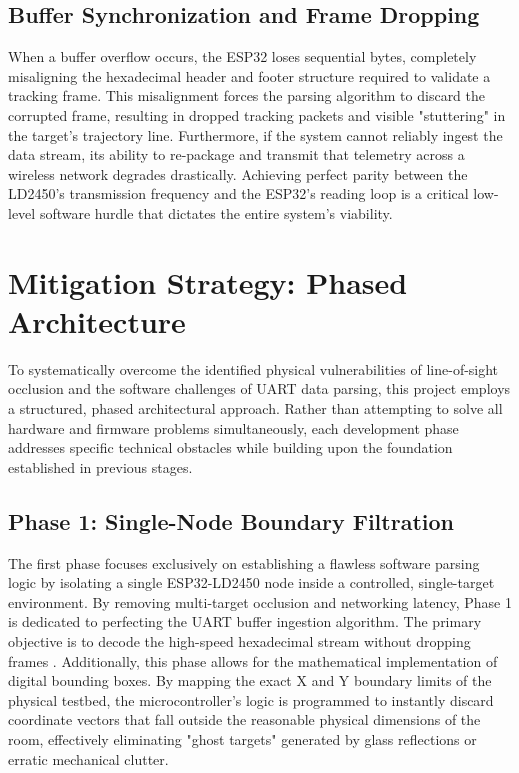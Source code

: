 \subsection{Buffer Synchronization and Frame Dropping}
When a buffer overflow occurs, the ESP32 loses sequential bytes, completely misaligning the hexadecimal header and footer structure required to validate a tracking frame. This misalignment forces the parsing algorithm to discard the corrupted frame, resulting in dropped tracking packets and visible "stuttering" in the target's trajectory line. Furthermore, if the system cannot reliably ingest the data stream, its ability to re-package and transmit that telemetry across a wireless network degrades drastically. Achieving perfect parity between the LD2450's transmission frequency and the ESP32's reading loop is a critical low-level software hurdle that dictates the entire system's viability.

\section{Mitigation Strategy: Phased Architecture}
To systematically overcome the identified physical vulnerabilities of line-of-sight occlusion and the software challenges of UART data parsing, this project employs a structured, phased architectural approach. Rather than attempting to solve all hardware and firmware problems simultaneously, each development phase addresses specific technical obstacles while building upon the foundation established in previous stages. 

\subsection{Phase 1: Single-Node Boundary Filtration}
The first phase focuses exclusively on establishing a flawless software parsing logic by isolating a single ESP32-LD2450 node inside a controlled, single-target environment. By removing multi-target occlusion and networking latency, Phase 1 is dedicated to perfecting the UART buffer ingestion algorithm. The primary objective is to decode the high-speed hexadecimal stream without dropping frames \cite{hi-link-ld2450-datasheet}. Additionally, this phase allows for the mathematical implementation of digital bounding boxes. By mapping the exact X and Y boundary limits of the physical testbed, the microcontroller's logic is programmed to instantly discard coordinate vectors that fall outside the reasonable physical dimensions of the room, effectively eliminating "ghost targets" generated by glass reflections or erratic mechanical clutter.

